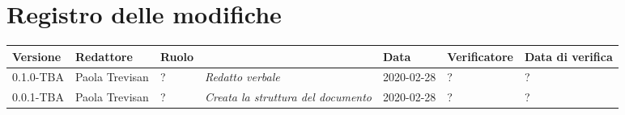 \section*{Registro delle modifiche}
\renewcommand{\arraystretch}{1.8}

  \begin{longtable}{|p{1.5cm}|p{1.7cm}|p{2cm}|p{2cm}|p{1.7cm}|p{2cm}|p{1.7cm}|}
    \hline

    \rowcolor{header}
    \textbf{Versione} & \textbf{Redattore} & \textbf{Ruolo} & \centering{\textbf{Descrizione}} & \textbf{Data} & \textbf{Verificatore} & \textbf{Data di verifica}\\

    \hline
	0.1.0-TBA & Paola Trevisan & ? & \small{\textit{Redatto verbale}} & 2020-02-28 & ? & ? \\
    0.0.1-TBA & Paola Trevisan & ? & \small{\textit{Creata la struttura del documento}} & 2020-02-28 & ? & ?\\

    \hline
  \end{longtable}
